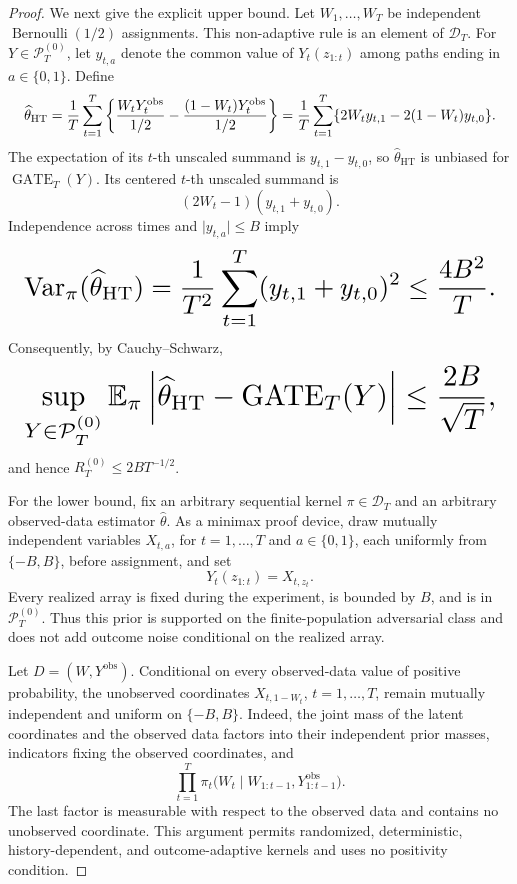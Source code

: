 \documentclass{article}
\begin{document}
\begin{proof}
We next give the explicit upper bound. Let \(W_1,\ldots,W_T\) be independent \(\operatorname{Bernoulli}(1/2)\) assignments. This non-adaptive rule is an element of \(\mathcal D_T\). For \(Y\in\mathcal P_T^{(0)}\), let \(y_{t,a}\) denote the common value of \(Y_t(z_{1:t})\) among paths ending in \(a\in\{0,1\}\). Define
\[
\makebox[\linewidth][c]{\resizebox{0.98\linewidth}{!}{\(\displaystyle \widehat\theta_{\mathrm{HT}}
=\frac1T\sum_{t=1}^T\left\{\frac{W_tY_t^{\mathrm{obs}}}{1/2}-\frac{(1-W_t)Y_t^{\mathrm{obs}}}{1/2}\right\}
=\frac1T\sum_{t=1}^T\{2W_ty_{t,1}-2(1-W_t)y_{t,0}\}.\)}}
\]
The expectation of its \(t\)-th unscaled summand is \(y_{t,1}-y_{t,0}\), so \(\widehat\theta_{\mathrm{HT}}\) is unbiased for \(\operatorname{GATE}_T(Y)\). Its centered \(t\)-th unscaled summand is
\[
(2W_t-1)(y_{t,1}+y_{t,0}).
\]
Independence across times and \(\lvert y_{t,a}\rvert\le B\) imply
\[
\makebox[\linewidth][c]{\resizebox{0.98\linewidth}{!}{\(\displaystyle \operatorname{Var}_\pi(\widehat\theta_{\mathrm{HT}})
=\frac1{T^2}\sum_{t=1}^T(y_{t,1}+y_{t,0})^2
\le \frac{4B^2}{T}.\)}}
\]
Consequently, by Cauchy--Schwarz,
\[
\makebox[\linewidth][c]{\resizebox{0.98\linewidth}{!}{\(\displaystyle \sup_{Y\in\mathcal P_T^{(0)}}
\mathbb E_\pi\left|\widehat\theta_{\mathrm{HT}}-\operatorname{GATE}_T(Y)\right|
\le \frac{2B}{\sqrt T},\)}}
\]
and hence \(R_T^{(0)}\le 2B T^{-1/2}\).

For the lower bound, fix an arbitrary sequential kernel \(\pi\in\mathcal D_T\) and an arbitrary observed-data estimator \(\widehat\theta\). As a minimax proof device, draw mutually independent variables \(X_{t,a}\), for \(t=1,\ldots,T\) and \(a\in\{0,1\}\), each uniformly from \(\{-B,B\}\), before assignment, and set
\[
Y_t(z_{1:t})=X_{t,z_t}.
\]
Every realized array is fixed during the experiment, is bounded by \(B\), and is in \(\mathcal P_T^{(0)}\). Thus this prior is supported on the finite-population adversarial class and does not add outcome noise conditional on the realized array.

Let \(D=(W,Y^{\mathrm{obs}})\). Conditional on every observed-data value of positive probability, the unobserved coordinates \(X_{t,1-W_t}\), \(t=1,\ldots,T\), remain mutually independent and uniform on \(\{-B,B\}\). Indeed, the joint mass of the latent coordinates and the observed data factors into their independent prior masses, indicators fixing the observed coordinates, and
\[
\prod_{t=1}^T\pi_t\bigl(W_t\mid W_{1:t-1},Y_{1:t-1}^{\mathrm{obs}}\bigr).
\]
The last factor is measurable with respect to the observed data and contains no unobserved coordinate. This argument permits randomized, deterministic, history-dependent, and outcome-adaptive kernels and uses no positivity condition.


\end{proof}
\end{document}
